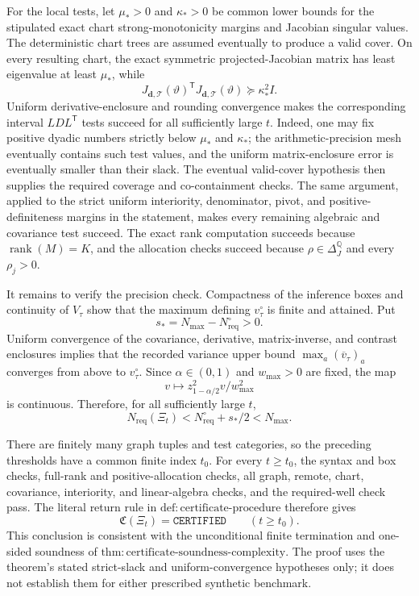 For the local tests, let \(\mu_*>0\) and \(\kappa_*>0\) be common lower bounds for the stipulated exact chart strong-monotonicity margins and Jacobian singular values.  The deterministic chart trees are assumed eventually to produce a valid cover.  On every resulting chart, the exact symmetric projected-Jacobian matrix has least eigenvalue at least \(\mu_*\), while
\[
 J_{\boldsymbol d,\mathcal T}(\vartheta)^{\mathsf T}
 J_{\boldsymbol d,\mathcal T}(\vartheta)
 \succeq \kappa_*^2 I.
\]
Uniform derivative-enclosure and rounding convergence makes the corresponding interval \(LDL^{\mathsf T}\) tests succeed for all sufficiently large \(t\).  Indeed, one may fix positive dyadic numbers strictly below \(\mu_*\) and \(\kappa_*\); the arithmetic-precision mesh eventually contains such test values, and the uniform matrix-enclosure error is eventually smaller than their slack.  The eventual valid-cover hypothesis then supplies the required coverage and co-containment checks.  The same argument, applied to the strict uniform interiority, denominator, pivot, and positive-definiteness margins in the statement, makes every remaining algebraic and covariance test succeed.  The exact rank computation succeeds because \(\operatorname{rank}(M)=K\), and the allocation checks succeed because \(\rho\in\Delta_J^{\mathbb Q}\) and every \(\rho_j>0\).

It remains to verify the precision check.  Compactness of the inference boxes and continuity of \(V_\tau\) show that the maximum defining \(v_\tau^\circ\) is finite and attained.  Put
\[
 s_*=N_{\max}-N_{\mathrm{req}}^\circ>0.
\]
Uniform convergence of the covariance, derivative, matrix-inverse, and contrast enclosures implies that the recorded variance upper bound \(\max_a(\overline v_\tau)_a\) converges from above to \(v_\tau^\circ\).  Since \(\alpha\in(0,1)\) and \(w_{\max}>0\) are fixed, the map
\[
 v\longmapsto z_{1-\alpha/2}^2v/w_{\max}^2
\]
is continuous.  Therefore, for all sufficiently large \(t\),
\[
 N_{\mathrm{req}}(\Xi_t)
 <N_{\mathrm{req}}^\circ+s_*/2
 <N_{\max}.
\]

There are finitely many graph tuples and test categories, so the preceding thresholds have a common finite index \(t_0\).  For every \(t\geq t_0\), the syntax and box checks, full-rank and positive-allocation checks, all graph, remote, chart, covariance, interiority, and linear-algebra checks, and the required-well check pass.  The literal return rule in \(\mathrm{def{:}certificate\text{-}procedure}\) therefore gives
\[
 \mathfrak C(\Xi_t)=\mathtt{CERTIFIED}\qquad(t\geq t_0).
\]
This conclusion is consistent with the unconditional finite termination and one-sided soundness of \(\mathrm{thm{:}certificate\text{-}soundness\text{-}complexity}\).  The proof uses the theorem's stated strict-slack and uniform-convergence hypotheses only; it does not establish them for either prescribed synthetic benchmark.
